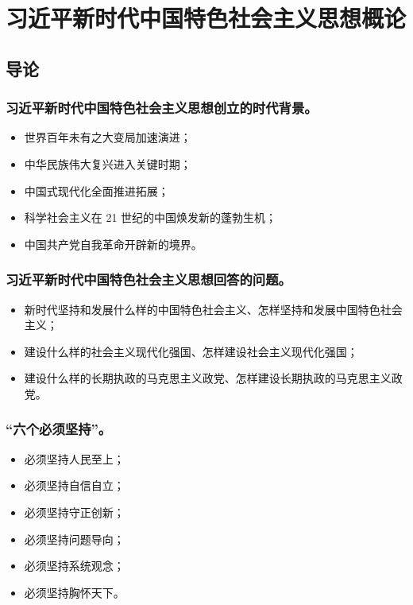 \documentclass{article}
\begin{document}
\newpage

\section{习近平新时代中国特色社会主义思想概论}

\subsection{导论}

\subsubsection{习近平新时代中国特色社会主义思想创立的时代背景。}
\begin{itemize}
    \item 世界百年未有之大变局加速演进；
    \item 中华民族伟大复兴进入关键时期；
    \item 中国式现代化全面推进拓展；
    \item 科学社会主义在 21 世纪的中国焕发新的蓬勃生机；
    \item 中国共产党自我革命开辟新的境界。
\end{itemize}

\subsubsection{习近平新时代中国特色社会主义思想回答的问题。}
\begin{itemize}
    \item 新时代坚持和发展什么样的中国特色社会主义、怎样坚持和发展中国特色社会主义；
    \item 建设什么样的社会主义现代化强国、怎样建设社会主义现代化强国；
    \item 建设什么样的长期执政的马克思主义政党、怎样建设长期执政的马克思主义政党。
\end{itemize}

\subsubsection{“六个必须坚持”。}
\begin{itemize}
    \item 必须坚持人民至上；
    \item 必须坚持自信自立；
    \item 必须坚持守正创新；
    \item 必须坚持问题导向；
    \item 必须坚持系统观念；
    \item 必须坚持胸怀天下。
\end{itemize}
\end{document}
